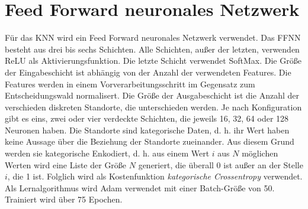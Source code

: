 \section{Feed Forward neuronales Netzwerk}
\label{sec:model_ffnn}
Für das KNN wird ein Feed Forward neuronales Netzwerk verwendet.
Das FFNN besteht aus drei bis sechs Schichten.
Alle Schichten, außer der letzten, verwenden ReLU als Aktivierungsfunktion.
Die letzte Schicht verwendet SoftMax.
\newline
\newline
Die Größe der Eingabeschicht ist abhängig von der Anzahl der verwendeten Features.
Die Features werden in einem Vorverarbeitungsschritt im Gegensatz zum Entscheidungswald normalisert.
Die Größe der Ausgabeschicht ist die Anzahl der verschieden diskreten Standorte, die unterschieden werden.
Je nach Konfiguration gibt es eins, zwei oder vier verdeckte Schichten, die jeweils 16, 32, 64 oder 128 Neuronen haben.
\newline
\newline
Die Standorte sind kategorische Daten, d. h. ihr Wert haben keine Aussage über die Beziehung der Standorte zueinander.
Aus diesem Grund werden sie kategorische Enkodiert, d. h. aus einem Wert $i$ aus $N$ möglichen Werten wird eine Liste der Größe $N$ generiert,
die überall 0 ist außer an der Stelle $i$, die 1 ist.
Folglich wird als Kostenfunktion \textit{kategorische Crossentropy} verwendet.
\newline
\newline
Als Lernalgorithmus wird Adam verwendet mit einer Batch-Größe von 50.
Trainiert wird über 75 Epochen.

\iffalse
\begin{itemize}
    \item Braucht man mehr Neuronen/Hidden Layer mit steigender Ort Anzahl?
\end{itemize}
\fi